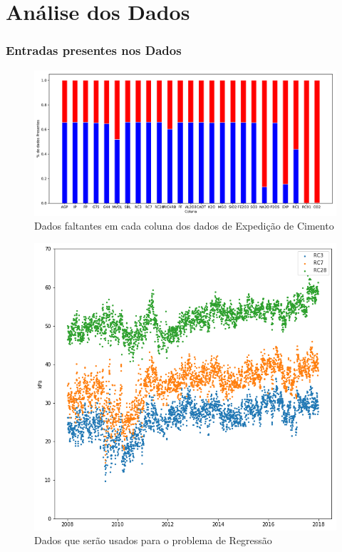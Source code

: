 \documentclass{beamer}
\begin{document}
\section{Análise dos Dados}

\begin{frame}
  \frametitle{Entradas presentes nos Dados}
\begin{figure}[H]
\centering
\includegraphics[scale=0.3]{slides_dados_pct}
\caption{Dados faltantes em cada coluna dos dados de Expedição de Cimento}
\end{figure}

\end{frame}

\begin{frame}
\begin{figure}[H]
\centering
\includegraphics[scale=0.4]{slides_dados}
\caption{Dados que serão usados para o problema de Regressão}
\end{figure}

\end{frame}
\end{document}
